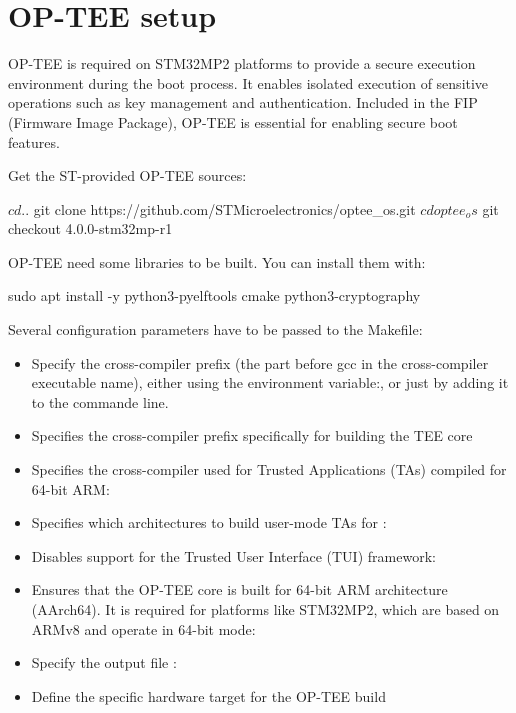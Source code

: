 \section{OP-TEE setup}
OP-TEE is required on STM32MP2 platforms to provide a secure execution environment during the boot process.
  It enables isolated execution of sensitive operations such as key management and authentication.
  Included in the FIP (Firmware Image Package), OP-TEE is essential for enabling secure boot features.

Get the ST-provided OP-TEE sources:

\begin{bashinput}
$ cd ..
$ git clone https://github.com/STMicroelectronics/optee_os.git
$ cd optee_os
$ git checkout 4.0.0-stm32mp-r1
\end{bashinput}

OP-TEE need some libraries to be built. You can install them with:
\begin{bashinput} 
sudo apt install -y python3-pyelftools cmake python3-cryptography
\end{bashinput}

Several configuration parameters have to be passed to the Makefile:
\begin{itemize}
\item Specify the cross-compiler prefix (the part before gcc in the
    cross-compiler executable name), either using the environment
    variable:, or just by
    adding it to the  commande line.
\item  Specifies the cross-compiler prefix specifically for building the TEE core
\item Specifies the cross-compiler used for Trusted Applications (TAs) compiled for 64-bit ARM:
\item Specifies which architectures to build user-mode TAs for :
\item  Disables support for the Trusted User Interface (TUI) framework:
\item Ensures that the OP-TEE core is built for 64-bit ARM architecture (AArch64).
    It is required for platforms like STM32MP2,
    which are based on ARMv8 and operate in 64-bit mode: 
\item Specify the output file : 
\item Define the specific hardware target for the OP-TEE build 
\end{itemize}

